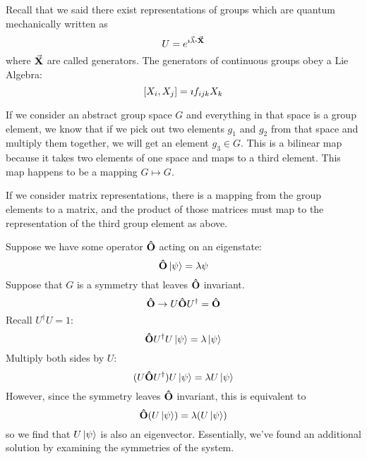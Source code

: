 \documentclass[a4paper,twoside,master.tex]{subfiles}
\begin{document}

Recall that we said there exist representations of groups which are quantum mechanically written as
\begin{equation}
    U = e^{\imath \va{\lambda} \vdot\va{ X}}
\end{equation}
where $\va{ X} $ are called generators. The generators of continuous groups obey a Lie Algebra:
\begin{equation}
    \comm{X_i}{X_j} = \imath f_{ijk} X_k
\end{equation}

\begin{definition}[Representation]
    If we consider an abstract group space $ G $ and everything in that space is a group element, we know that if we pick out two elements $ g_1 $ and $ g_2 $ from that space and multiply them together, we will get an element $ g_3 \in G $. This is a bilinear map because it takes two elements of one space and maps to a third element. This map happens to be a mapping $ G \mapsto G $.

    If we consider matrix representations, there is a mapping from the group elements to a matrix, and the product of those matrices must map to the representation of the third group element as above.
\end{definition}

Suppose we have some operator $\vu{ O} $ acting on an eigenstate:
\begin{equation}
    \vu{ O}\ket{\psi} = \lambda \psi
\end{equation}
Suppose that $ G $ is a symmetry that leaves $\vu{ O} $ invariant.
\begin{equation}
    \vu{O} \to U\vu{O}U^\dagger = \vu{O}
\end{equation}
Recall $ U^\dagger U = 1$:
\begin{equation}
    \vu{ O} U^\dagger U\ket{\psi} = \lambda\ket{\psi}
\end{equation}
Multiply both sides by $ U $:
\begin{equation}
    (U\vu{ O} U^\dagger )U\ket{\psi} = \lambda U\ket{\psi}
\end{equation}
However, since the symmetry leaves $ \vu{O} $ invariant, this is equivalent to
\begin{equation}
    \vu{ O} (U\ket{\psi}) = \lambda (U\ket{\psi})
\end{equation}
so we find that $ U\ket{\psi} $ is also an eigenvector. Essentially, we've found an additional solution by examining the symmetries of the system.
\end{document}
